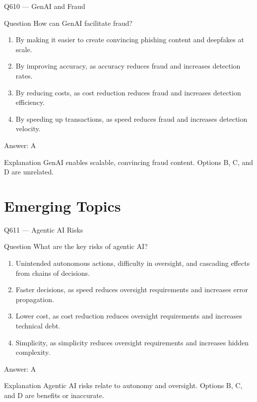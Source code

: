 \documentclass[aspectratio=169,8pt]{beamer}
\begin{document}
	\begin{frame}{Q610 --- GenAI and Fraud}
		\begin{block}{Question}
			How can GenAI facilitate fraud?
			\begin{enumerate}
				\item By making it easier to create convincing phishing content and deepfakes at scale.
				\item By improving accuracy, as accuracy reduces fraud and increases detection rates.
				\item By reducing costs, as cost reduction reduces fraud and increases detection efficiency.
				\item By speeding up transactions, as speed reduces fraud and increases detection velocity.
			\end{enumerate}
		\end{block}
		\begin{exampleblock}{Answer: A}\end{exampleblock}
		\begin{block}{Explanation}
			GenAI enables scalable, convincing fraud content. Options B, C, and D are unrelated.
		\end{block}
	\end{frame}
	
	\section{Emerging Topics}
	
	\begin{frame}{Q611 --- Agentic AI Risks}
		\begin{block}{Question}
			What are the key risks of agentic AI?
			\begin{enumerate}
				\item Unintended autonomous actions, difficulty in oversight, and cascading effects from chains of decisions.
				\item Faster decisions, as speed reduces oversight requirements and increases error propagation.
				\item Lower cost, as cost reduction reduces oversight requirements and increases technical debt.
				\item Simplicity, as simplicity reduces oversight requirements and increases hidden complexity.
			\end{enumerate}
		\end{block}
		\begin{exampleblock}{Answer: A}\end{exampleblock}
		\begin{block}{Explanation}
			Agentic AI risks relate to autonomy and oversight. Options B, C, and D are benefits or inaccurate.
		\end{block}
	\end{frame}
	
\end{document}
